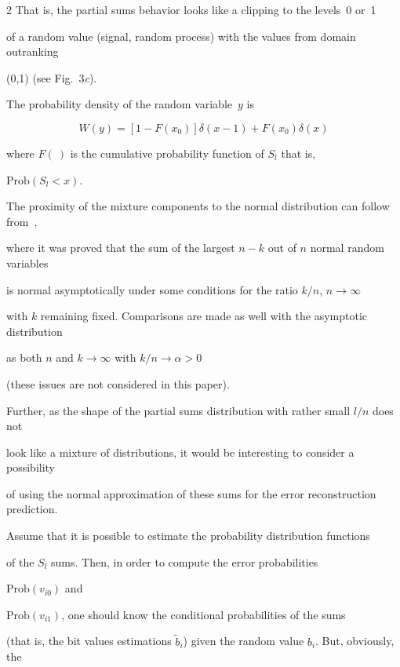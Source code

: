 \begin{multicols}{2}
   That is,  the  partial sums  behavior looks like  a clipping  to the levels~0 or~1 

   of a random value (signal, random  process) with the values from domain  outranking 

   (0,1) (see Fig.~3\textit{c}).



The probability density of the random variable~$y$ is

$$

W(y)=[1- F (x_0)] \delta(x-1) +F(x_0) \delta(x)

$$

where $F(\ )$ is the cumulative probability function of $S_l$ that is,

 $\mathrm{Prob}\left(S_l<x\right)$.



The proximity of the mixture components to the normal distribution can follow from~\cite{5-fr}, 

where it was proved that the sum of the largest $n-k$ out of $n$ normal random variables 

is normal asymptotically under some conditions for the ratio $k/n$, $n \rightarrow \infty$  

with $k$ remaining fixed. Comparisons are made as well with the asymptotic distribution 

as both $n$ and $k \rightarrow \infty$   with $ k/n  \rightarrow \alpha> 0 $

(these issues are not considered in this paper).



Further, as the shape of the partial sums distribution with rather small $l/n$ does not 

look like a mixture of distributions, it would be interesting to consider a possibility 

of using the normal approximation of these sums  for the error reconstruction prediction.



       Assume that it is possible to estimate the probability distribution functions 

       of the $S_l$ sums. Then, in order to compute the error probabilities  

       $\mathrm{Prob}\left(v_{i0}\right)$ and

       $\mathrm{Prob}\left(v_{i1}\right)$, one should know the conditional probabilities of the sums 

       (that is, the  bit values estimations $\tilde b_i$) given the random value $b_i$. But, obviously, the 


\end{multicols}
